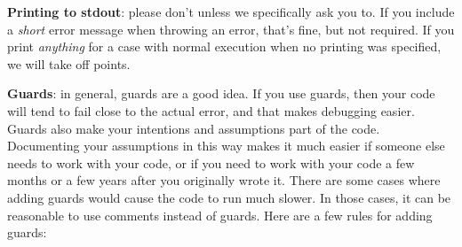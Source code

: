 \documentclass{article}
\begin{document}
\textbf{Printing to stdout}: please don't unless we specifically ask you to.
If you include a \emph{short} error message when throwing an error, that's
fine, but not required.  If you print \emph{anything} for a case with normal
execution when no printing was specified, we will take off points.

\textbf{Guards}: in general, guards are a good idea.
If you use guards, then your code will tend to fail close to the actual error, and
that makes debugging easier.
Guards also make your intentions and assumptions part of the code.
Documenting your assumptions in this way makes it much easier if someone else needs
to work with your code, or if you need to work with your code a few months or a few
years after you originally wrote it.
There are some cases where adding guards would cause the code to run much slower.
In those cases, it can be reasonable to use comments instead of guards.
Here are a few rules for adding guards:
\end{document}

